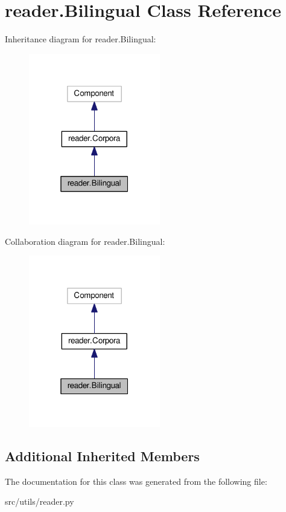 \hypertarget{classreader_1_1Bilingual}{}\section{reader.\+Bilingual Class Reference}
\label{classreader_1_1Bilingual}


Inheritance diagram for reader.\+Bilingual\+:
\nopagebreak
\begin{figure}[H]
\begin{center}
\leavevmode
\includegraphics[width=163pt]{classreader_1_1Bilingual__inherit__graph}
\end{center}
\end{figure}


Collaboration diagram for reader.\+Bilingual\+:
\nopagebreak
\begin{figure}[H]
\begin{center}
\leavevmode
\includegraphics[width=163pt]{classreader_1_1Bilingual__coll__graph}
\end{center}
\end{figure}
\subsection*{Additional Inherited Members}


The documentation for this class was generated from the following file\+:\begin{DoxyCompactItemize}
\item 
src/utils/reader.\+py\end{DoxyCompactItemize}
